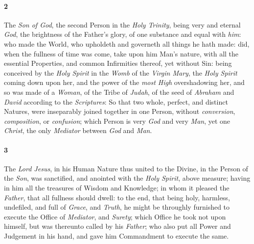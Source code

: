 \documentclass[
    paper=letterpaper,
    11pt,
    twoside,
    DIV=calc,
    openany
]{scrbook}
\newcommand{\ERRATA}[1]{}
\begin{document}
\paragraph{2} %
The \textit{Son of God}, the second Person in the \textit{Holy Trinity}, being very and eternal \textit{God}, the brightness of the Father’s glory, of one substance and equal with \textit{him}: who made the World, who upholdeth and governeth all things he hath made: did, when the fullness of time was come, take upon him \R{}Man’s nature, with all the essential Properties, and common Infirmities thereof, \R{}yet without Sin: being conceived by the \textit{Holy Spirit} in the \textit{Womb} of the \textit{Virgin Mary}, the \textit{Holy Spirit} coming down upon her, and the power of the \textit{most High} overshadowing her, \R{}and so was made of a \textit{Woman}, of the Tribe of \textit{Judah}, of the seed of \textit{Abraham} and \textit{David} according to the \textit{Scriptures}: So that two whole, perfect, and distinct Natures, were inseparably joined together in one Person, without \textit{conversion}, \textit{composition}, or \textit{confusion}; which Person is very \textit{God} and very \textit{Man}, yet one \R{}\textit{Christ}, the only \textit{Mediator} between \textit{God} and \textit{Man}.

\footnotebegin
{}
\ERRATA{
1688, 1719: Does not have Matthew 1:22,23
lbcw: Adds Matthew 1:22,23
reni: Places it with the Luke reference
}
\footnoteend

\paragraph{3} %
The \textit{Lord Jesus}, in his Human Nature thus united to the Divine, in the Person of the \textit{Son}, was sanctified, and anointed \R{}with the \textit{Holy Spirit}, above measure; having in him \R{}all the treasures of Wisdom and Knowledge; in whom it pleased the \textit{Father}, that \R{}all fullness should dwell: to the end, that being \R{}holy, harmless, undefiled, and full \R{}of \textit{Grace}, and \textit{Truth}, he might be throughly furnished to execute the Office of \textit{Mediator}, and \R{}\textit{Surety}; which Office he took not upon himself, but was thereunto \R{}called by his \textit{Father}; who also put \R{}all Power and Judgement in his hand, and gave him Commandment to execute the same.

\footnotebegin
{}
\footnoteend
\end{document}
